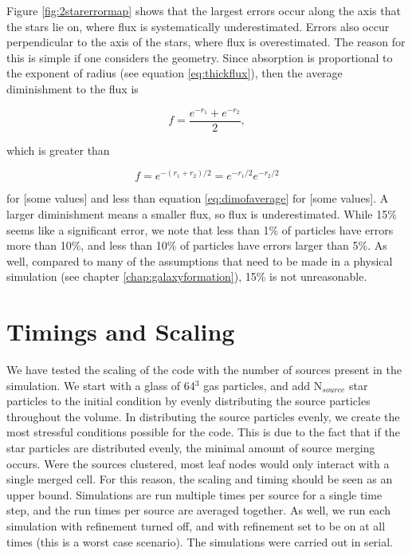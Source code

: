 Figure \ref{fig:2starerrormap} shows that the largest errors occur along the axis that the stars lie on, where flux is systematically underestimated. Errors also occur perpendicular to the axis of the stars, where flux is overestimated. The reason for this is simple if one considers the geometry. Since absorption is proportional to the exponent of radius (see equation \ref{eq:thickflux}), then the average diminishment to the flux is

\begin{equation}
\label{eq:averageofdim}
f = \frac{e^{-r_1}+e^{-r_2}}{2},
\end{equation}

\noindent
which is greater than

\begin{equation}
\label{eq:dimofaverage}
f = e^{-(r_1+r_2)/2} = e^{-r_1/2}e^{-r_2/2}
\end{equation}

\noindent
for [some values] and less than equation \ref{eq:dimofaverage} for [some values]. A larger diminishment means a smaller flux, so flux is underestimated. While 15\% seems like a significant error, we note that less than 1\% of particles have errors more than 10\%, and less than 10\% of particles have errors larger than 5\%. As well, compared to many of the assumptions that need to be made in a physical simulation (see chapter \ref{chap:galaxyformation}), 15\% is not unreasonable.

\section{Timings and Scaling}
\label{sec:timing}

We have tested the scaling of the code with the number of sources present in the simulation. We start with a glass of 64$^3$ gas particles, and add N$_{source}$ star particles to the initial condition by evenly distributing the source particles throughout the volume. In distributing the source particles evenly, we create the most stressful conditions possible for the code. This is due to the fact that if the star particles are distributed evenly, the minimal amount of source merging occurs. Were the sources clustered, most leaf nodes would only interact with a single merged cell. For this reason, the scaling and timing should be seen as an upper bound. Simulations are run multiple times per source for a single time step, and the run times per source are averaged together. As well, we run each simulation with refinement turned off, and with refinement set to be on at all times (this is a worst case scenario). The simulations were carried out in serial.


